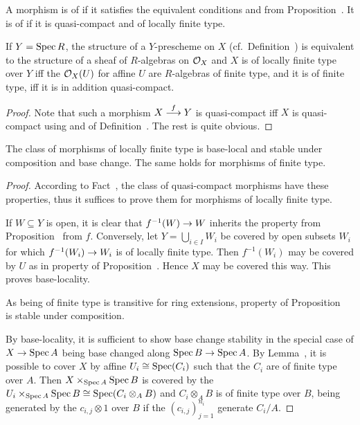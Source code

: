 \documentclass[a4paper,parskip=half,numbers=enddot, DIV=12]{scrreprt}
\begin{document}
\begin{defi}
    A morphism is of  if it satisfies the equivalent conditions  and  from Proposition~. It is of  if it is quasi-compact and of locally finite type.
\end{defi}

\begin{fact}
    If $Y=\operatorname{Spec} R$, the structure of a $Y$-prescheme on $X$ (cf.\ Definition~) is equivalent to the structure of a sheaf of $R$-algebras on $\mathcal{O}_X$ and $X$ is of locally finite type over $Y$ iff the $\mathcal{O}_X(U)$ for affine $U$ are $R$-algebras of finite type, and it is of finite type, iff it is in addition quasi-compact.
\end{fact}
\begin{proof}
	Note that such a  morphism $X\morphism[f]Y$ is quasi-compact iff $X$ is quasi-compact using \itememph{\alpha} and \itememph{\gamma} of Definition~. The rest is quite obvious.
\end{proof}
\begin{fact}
    The class of morphisms of locally finite type is base-local and stable under composition and base change. The same holds for morphisms of finite type. 
\end{fact}
\begin{proof}
    According to Fact~, the class of quasi-compact morphisms have these properties, thus it suffices to prove them for morphisms of locally finite type. 
    
    If $W\subseteq Y$ is open, it is clear that $f^{-1}(W)\morphism W$ inherits the property  from Proposition~ from $f$. Conversely, let $Y=\bigcup_{i\in I}W_i$ be covered by open subsets $W_i$ for which $f^{-1}(W_i)\morphism W_i$ is of locally finite type. Then $f^{-1}(W_i)$ may be covered by $U$ as in property  of Proposition~. Hence $X$ may be covered this way. This proves base-locality.
    
    As being of finite type is transitive for ring extensions, property  of Proposition~ is stable under composition.
    
    By base-locality, it is sufficient to show base change stability in the special case of $X\morphism \Spec A$ being base changed along $\Spec B\morphism \Spec A$. By Lemma~, it is possible to cover $X$ by affine $U_i\cong \operatorname{Spec}(C_i)$ such that the $C_i$ are of finite type over $A$. Then $X\times_{\operatorname{Spec} A} \operatorname{Spec} B$ is covered by the $U_i\times_{\operatorname{Spec} A} \operatorname{Spec} B \cong \operatorname{Spec}(C_i\otimes_A B)$ and $C_i\otimes_A B$ is of finite type over $B$, being generated by the $c_{i,j}\otimes 1$ over $B$ if the $(c_{i,j})_{j=1}^{n_i}$ generate $C_i/A$.
\end{proof}
\end{document}
